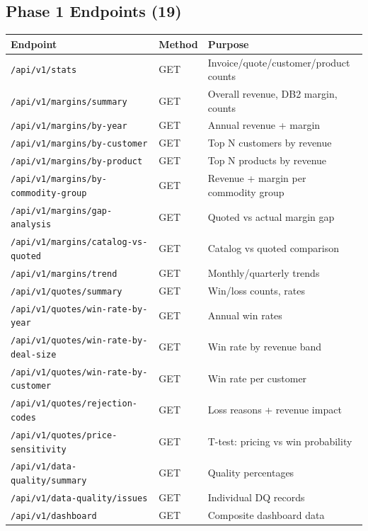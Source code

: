 \documentclass[11pt,a4paper]{article}
\newcommand{\code}[1]{\texttt{#1}}
\begin{document}
\subsection{Phase 1 Endpoints (19)}

\begin{longtable}{l l p{6cm}}
\toprule
\textbf{Endpoint} & \textbf{Method} & \textbf{Purpose} \\
\midrule
\endfirsthead
\code{/api/v1/stats}                    & GET & Invoice/quote/customer/product counts \\
\code{/api/v1/margins/summary}          & GET & Overall revenue, DB2 margin, counts \\
\code{/api/v1/margins/by-year}          & GET & Annual revenue + margin \\
\code{/api/v1/margins/by-customer}      & GET & Top N customers by revenue \\
\code{/api/v1/margins/by-product}       & GET & Top N products by revenue \\
\code{/api/v1/margins/by-commodity-group} & GET & Revenue + margin per commodity group \\
\code{/api/v1/margins/gap-analysis}     & GET & Quoted vs actual margin gap \\
\code{/api/v1/margins/catalog-vs-quoted}& GET & Catalog vs quoted comparison \\
\code{/api/v1/margins/trend}            & GET & Monthly/quarterly trends \\
\code{/api/v1/quotes/summary}           & GET & Win/loss counts, rates \\
\code{/api/v1/quotes/win-rate-by-year}  & GET & Annual win rates \\
\code{/api/v1/quotes/win-rate-by-deal-size} & GET & Win rate by revenue band \\
\code{/api/v1/quotes/win-rate-by-customer}  & GET & Win rate per customer \\
\code{/api/v1/quotes/rejection-codes}   & GET & Loss reasons + revenue impact \\
\code{/api/v1/quotes/price-sensitivity} & GET & T-test: pricing vs win probability \\
\code{/api/v1/data-quality/summary}     & GET & Quality percentages \\
\code{/api/v1/data-quality/issues}      & GET & Individual DQ records \\
\code{/api/v1/dashboard}                & GET & Composite dashboard data \\
\bottomrule
\end{longtable}
\end{document}
